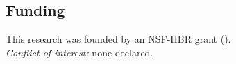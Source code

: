 
\subsection*{Funding}
This research was founded by an NSF-IIBR grant ().\\

\noindent \textit{Conflict of interest:} none declared.


\nolinenumbers


